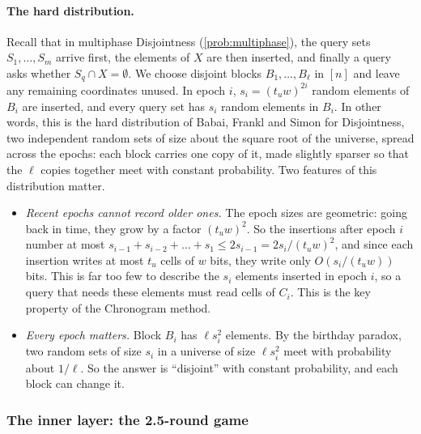 \documentclass[11pt]{article}
\theoremstyle{plain}
\theoremstyle{definition}
\theoremstyle{remark}
\begin{document}
\paragraph{The hard distribution.}
Recall that in multiphase Disjointness (\cref{prob:multiphase}), the query sets $S_1, \dots, S_m$ arrive first, the elements of $X$ are then inserted, and finally a query asks whether $S_q \cap X = \emptyset$. We choose disjoint blocks $B_1, \dots, B_\ell$ in $[n]$ and leave any remaining coordinates unused. In epoch $i$, $s_i = (t_u w)^{2i}$ random elements of $B_i$ are inserted, and every query set has $s_i$ random elements in $B_i$. In other words, this is the hard distribution of Babai, Frankl and Simon \cite{babai_complexity_1986} for Disjointness, two independent random sets of size about the square root of the universe, spread across the epochs: each block carries one copy of it, made slightly sparser so that the $\ell$ copies together meet with constant probability. Two features of this distribution matter.
\begin{itemize}[leftmargin=*]
  \item \emph{Recent epochs cannot record older ones.} The epoch sizes are geometric: going back in time, they grow by a factor $(t_u w)^2$. So the insertions after epoch $i$ number at most $s_{i-1} + s_{i-2} + \dots + s_1 \le 2 s_{i-1} = 2 s_i/(t_u w)^2$, and since each insertion writes at most $t_u$ cells of $w$ bits, they write only $O(s_i/(t_u w))$ bits. This is far too few to describe the $s_i$ elements inserted in epoch $i$, so a query that needs these elements must read cells of $C_i$. This is the key property of the Chronogram method.
  \item \emph{Every epoch matters.} Block $B_i$ has $\ell s_i^2$ elements. By the birthday paradox, two random sets of size $s_i$ in a universe of size $\ell s_i^2$ meet with probability about $1/\ell$. So the answer is ``disjoint'' with constant probability, and each block can change it.
\end{itemize}

\subsubsection{The inner layer: the 2.5-round game}
\end{document}
